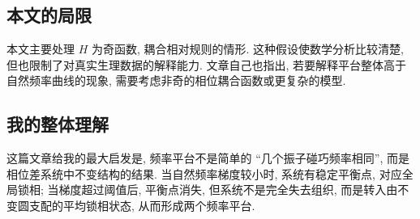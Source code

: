 \documentclass[oneside]{ctexart}
\begin{document}
\subsection{本文的局限}

本文主要处理 $H$ 为奇函数, 耦合相对规则的情形. 这种假设使数学分析比较清楚, 但也限制了对真实生理数据的解释能力. 文章自己也指出, 若要解释平台整体高于自然频率曲线的现象, 需要考虑非奇的相位耦合函数或更复杂的模型.

\subsection{我的整体理解}

这篇文章给我的最大启发是, 频率平台不是简单的 ``几个振子碰巧频率相同'', 而是相位差系统中不变结构的结果. 当自然频率梯度较小时, 系统有稳定平衡点, 对应全局锁相; 当梯度超过阈值后, 平衡点消失, 但系统不是完全失去组织, 而是转入由不变圆支配的平均锁相状态, 从而形成两个频率平台.
\end{document}
